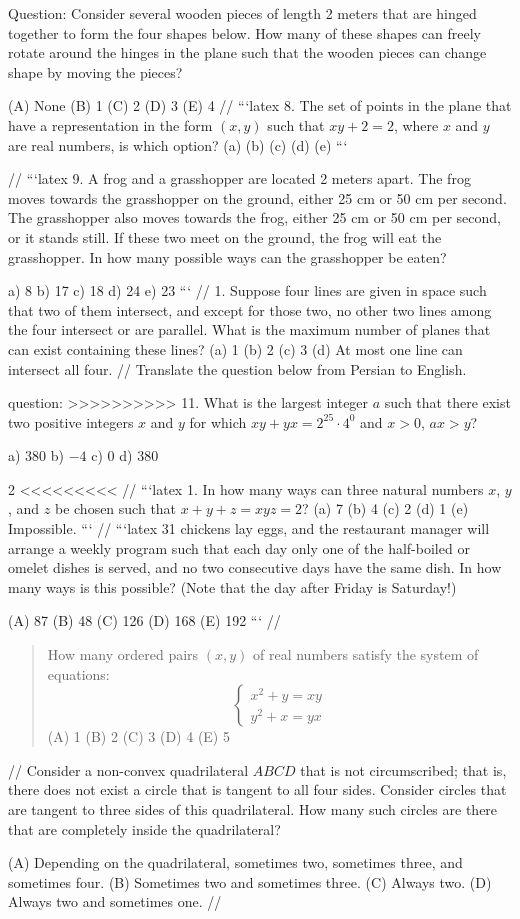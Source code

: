 Question:
Consider several wooden pieces of length 2 meters that are hinged together to form the four shapes below. How many of these shapes can freely rotate around the hinges in the plane such that the wooden pieces can change shape by moving the pieces?

(A) None (B) 1 (C) 2 (D) 3 (E) 4
//
```latex
8. The set of points in the plane that have a representation in the form $(x, y)$ such that $xy + 2 = 2$, where $x$ and $y$ are real numbers, is which option? 
(a) 
(b) 
(c) 
(d) 
(e) 
```

//
```latex
9. A frog and a grasshopper are located 2 meters apart. The frog moves towards the grasshopper on the ground, either 25 cm or 50 cm per second. The grasshopper also moves towards the frog, either 25 cm or 50 cm per second, or it stands still. If these two meet on the ground, the frog will eat the grasshopper. In how many possible ways can the grasshopper be eaten?

a) 8 \quad b) 17 \quad c) 18 \quad d) 24 \quad e) 23
```
//
1. Suppose four lines are given in space such that two of them intersect, and except for those two, no other two lines among the four intersect or are parallel. What is the maximum number of planes that can exist containing these lines? 
(a) 1 
(b) 2 
(c) 3 
(d) At most one line can intersect all four.
//
Translate the question below from Persian to English.

question:
>>>>>>>>>>
11. What is the largest integer $a$ such that there exist two positive integers $x$ and $y$ for which $xy + yx = 2^{25} \cdot 4^0$ and $x > 0$, $ax > y$?

a) $380$ b) $-4$ c) $0$ d) $380$

2
<<<<<<<<<
//
```latex
1. In how many ways can three natural numbers $x$, $y$, and $z$ be chosen such that $x + y + z = xyz = 2$? 
(a) 7 (b) 4 (c) 2 (d) 1 (e) Impossible.
```
//
```latex
31 chickens lay eggs, and the restaurant manager will arrange a weekly program such that each day only one of the half-boiled or omelet dishes is served, and no two consecutive days have the same dish. In how many ways is this possible? (Note that the day after Friday is Saturday!)

(A) 87 \quad (B) 48 \quad (C) 126 \quad (D) 168 \quad (E) 192
```
//
\begin{quote}
How many ordered pairs $(x, y)$ of real numbers satisfy the system of equations:
\[
\begin{cases} 
x^2 + y = xy \\
y^2 + x = yx 
\end{cases}
\]
(A) 1 \quad (B) 2 \quad (C) 3 \quad (D) 4 \quad (E) 5
\end{quote}
//
Consider a non-convex quadrilateral $ABCD$ that is not circumscribed; that is, there does not exist a circle that is tangent to all four sides. Consider circles that are tangent to three sides of this quadrilateral. How many such circles are there that are completely inside the quadrilateral? 

(A) Depending on the quadrilateral, sometimes two, sometimes three, and sometimes four.  
(B) Sometimes two and sometimes three.  
(C) Always two.  
(D) Always two and sometimes one.
//
